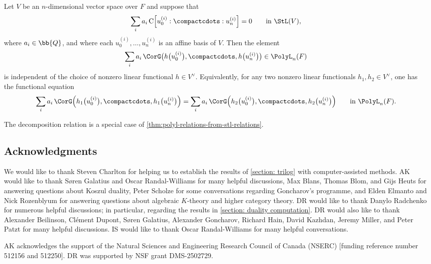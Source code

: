 \documentclass[a4paper]{amsart}
\begin{document}
\begin{atheorem}\label{thm:polyl-relations-from-stl-relations}
Let $V$ be an $n$-dimensional vector space over $F$ and suppose that
\[
   \sum_i a_i\, \mathrm C
   \Bigl[u^{(i)}_0:\compactcdots:u^{(i)}_n\Bigr]=0
   \qquad\text{in } \StL(V),
\]
where $a_i\in \bb{Q}$, and where each
$u^{(i)}_0,\ldots,u^{(i)}_n$ is an affine basis of $V$. Then the element
\[
   \sum_i a_i\,
   \CorG\bigl(
      h\bigl(u^{(i)}_0\bigr),\compactcdots,h\bigl(u^{(i)}_n\bigr)
   \bigr)
   \in \PolyL_n(F)
\]
is independent of the choice of nonzero linear functional
$h\in V^\vee$. Equivalently, for any two nonzero linear functionals $h_1,h_2\in V^\vee$, one has the functional equation
\[
   \sum_i a_i\,
   \CorG\Bigl(
      h_1\bigl(u^{(i)}_0\bigr),\compactcdots,h_1\bigl(u^{(i)}_n\bigr)
   \Bigr)
   =
   \sum_i a_i\,
   \CorG\Bigl(
      h_2\bigl(u^{(i)}_0\bigr),\compactcdots,h_2\bigl(u^{(i)}_n\bigr)
   \Bigr)
   \qquad\text{in } \PolyL_n(F).
\]
\end{atheorem}
The decomposition relation is a special case of \cref{thm:polyl-relations-from-stl-relations}.



\subsection*{Acknowledgments} We would like to thank Steven Charlton for helping us to establish the results of \cref{section: trilog} with computer-assisted methods.  AK would like to thank S\o ren Galatius and Oscar Randal-Williams for many helpful discussions, Max Blans, Thomas Blom, and Gijs Heuts for answering questions about Koszul duality, Peter Scholze for some conversations regarding Goncharov's programme, and Elden Elmanto and Nick Rozenblyum for answering questions about algebraic $K$-theory and higher category theory. DR would like to thank Danylo Radchenko for numerous helpful discussions; in particular, regarding the results in \cref{section: duality computation}. DR would also like to thank  Alexander Beilinson, Cl{\'e}ment Dupont, S\o ren Galatius, Alexander Goncharov, Richard Hain, David Kazhdan, Jeremy Miller, and Peter Patzt for many helpful discussions. IS would like to thank Oscar Randal-Williams for many helpful conversations.

AK acknowledges the support of the Natural Sciences and Engineering Research Council of Canada (NSERC) [funding reference number 512156 and 512250]. DR was supported by NSF grant DMS-2502729.
\end{document}
